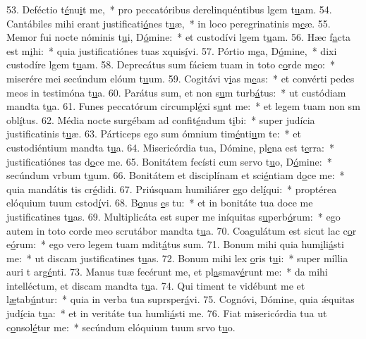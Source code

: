 53. Deféctio t\uline{é}nu\uline{i}t me,~* pro peccatóribus derelinquéntibus lgem t\uline{u}am.
54. Cantábiles mihi erant justificati\uline{ó}nes t\uline{u}æ,~* in loco peregrinatinis m\uline{e}æ.
55. Memor fui nocte nóminis t\uline{u}i, D\uline{ó}mine:~* et custodívi lgem t\uline{u}am.
56. Hæc f\uline{a}cta est m\uline{i}hi:~* quia justificatiónes tuas xquis\uline{í}vi.
57. Pórtio m\uline{e}a, D\uline{ó}mine,~* dixi custodíre lgem t\uline{u}am.
58. Deprecátus sum fáciem tuam in toto c\uline{o}rde m\uline{e}o:~* miserére mei secúndum elóum t\uline{u}um.
59. Cogitávi v\uline{i}as m\uline{e}as:~* et convérti pedes meos in testimóna t\uline{u}a.
60. Parátus sum, et non s\uline{u}m turb\uline{á}tus:~* ut custódiam mandta t\uline{u}a.
61. Funes peccatórum circumpl\uline{é}xi s\uline{u}nt me:~* et legem tuam non sm obl\uline{í}tus.
62. Média nocte surgébam ad confit\uline{é}ndum t\uline{i}bi:~* super judícia justificatinis t\uline{u}æ.
63. Párticeps ego sum ómnium tim\uline{é}nti\uline{u}m te:~* et custodiéntium mandta t\uline{u}a.
64. Misericórdia tua, Dómine, pl\uline{e}na est t\uline{e}rra:~* justificatiónes tas d\uline{o}ce me.
65. Bonitátem fecísti cum servo t\uline{u}o, D\uline{ó}mine:~* secúndum vrbum t\uline{u}um.
66. Bonitátem et disciplínam et sci\uline{é}ntiam d\uline{o}ce me:~* quia mandátis tis cr\uline{é}didi.
67. Priúsquam humiliárer \uline{e}go del\uline{í}qui:~* proptérea elóquium tuum cstod\uline{í}vi.
68. B\uline{o}nus \uline{e}s tu:~* et in bonitáte tua doce me justificatines t\uline{u}as.
69. Multiplicáta est super me iníquitas s\uline{u}perb\uline{ó}rum:~* ego autem in toto corde meo scrutábor mandta t\uline{u}a.
70. Coagulátum est sicut lac c\uline{o}r e\uline{ó}rum:~* ego vero legem tuam mdit\uline{á}tus sum.
71. Bonum mihi quia hum\uline{i}li\uline{á}sti me:~* ut discam justificatines t\uline{u}as.
72. Bonum mihi lex \uline{o}ris t\uline{u}i:~* super míllia auri t arg\uline{é}nti.
73. Manus tuæ fecérunt me, et pl\uline{a}smav\uline{é}runt me:~* da mihi intelléctum, et discam mandta t\uline{u}a.
74. Qui timent te vidébunt me et l\uline{æ}tab\uline{ú}ntur:~* quia in verba tua suprsper\uline{á}vi.
75. Cognóvi, Dómine, quia ǽquitas jud\uline{í}cia t\uline{u}a:~* et in veritáte tua humli\uline{á}sti me.
76. Fiat misericórdia tua ut c\uline{o}nsol\uline{é}tur me:~* secúndum elóquium tuum srvo t\uline{u}o.
